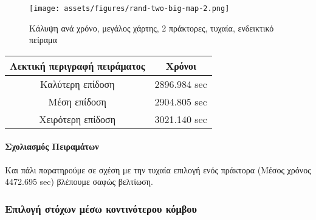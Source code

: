 
\begin{figure}[!h]
	\centering
	\texttt{[image: assets/figures/rand-two-big-map-2.png]}
	\caption{Κάλυψη ανά χρόνο, μεγάλος χάρτης, 2 πράκτορες, τυχαία, ενδεικτικό πείραμα}
\end{figure}



\begingroup
\centering
\begin{tabular}{c | c }
	\textbf{Λεκτική περιγραφή πειράματος} & \textbf{Χρόνοι}\\ \hline{}
	Καλύτερη επίδοση & 2896.984 sec \\ \hline
	Μέση επίδοση & 2904.805 sec   \\ \hline
	Χειρότερη επίδοση & 3021.140 sec \\
\end{tabular}
\endgroup
\paragraph{Σχολιασμός Πειραμάτων}

Και πάλι παρατηρούμε σε σχέση με την τυχαία επιλογή ενός πράκτορα (Μέσος χρόνος 4472.695 sec) βλέπουμε σαφώς βελτίωση.  

\newpage



\subsubsection{Επιλογή στόχων μέσω κοντινότερου κόμβου}


